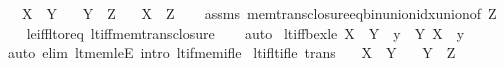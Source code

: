 \begin{isabellebody}
\ \ \ {\isachardoublequoteopen}X\ {\isasymle}\ Y{\isachardoublequoteclose}\isanewline
\ \ \ {\isachardoublequoteopen}Y\ {\isasymin}\ Z{\isachardoublequoteclose}\isanewline
\ \ \ {\isachardoublequoteopen}X\ {\isacharless}{\kern0pt}\ Z{\isachardoublequoteclose}\isanewline
%
\isadelimproof
\ \ %
\endisadelimproof
%
\isatagproof
{}\isamarkupfalse%
\ assms\ mem{\isacharunderscore}{\kern0pt}trans{\isacharunderscore}{\kern0pt}closure{\isacharunderscore}{\kern0pt}eq{\isacharunderscore}{\kern0pt}bin{\isacharunderscore}{\kern0pt}union{\isacharunderscore}{\kern0pt}idx{\isacharunderscore}{\kern0pt}union{\isacharbrackleft}{\kern0pt}of\ Z{\isacharbrackright}{\kern0pt}\isanewline
\ \ \isamarkupfalse%
\ le{\isacharunderscore}{\kern0pt}iff{\isacharunderscore}{\kern0pt}lt{\isacharunderscore}{\kern0pt}or{\isacharunderscore}{\kern0pt}eq\ lt{\isacharunderscore}{\kern0pt}iff{\isacharunderscore}{\kern0pt}mem{\isacharunderscore}{\kern0pt}trans{\isacharunderscore}{\kern0pt}closure\isanewline
\ \ \isamarkupfalse%
\ auto%
\endisatagproof
{\isafoldproof}%
%
\isadelimproof
\isanewline
%
\endisadelimproof
\isanewline
{}\isamarkupfalse%
\ lt{\isacharunderscore}{\kern0pt}iff{\isacharunderscore}{\kern0pt}bex{\isacharunderscore}{\kern0pt}le{\isacharcolon}{\kern0pt}\ {\isachardoublequoteopen}X\ {\isacharless}{\kern0pt}\ Y\ {\isasymlongleftrightarrow}\ {\isacharparenleft}{\kern0pt}{\isasymexists}y\ {\isasymin}\ Y{\isachardot}{\kern0pt}\ X\ {\isasymle}\ y{\isacharparenright}{\kern0pt}{\isachardoublequoteclose}\isanewline
%
\isadelimproof
\ \ %
\endisadelimproof
%
\isatagproof
{}\isamarkupfalse%
\ {\isacharparenleft}{\kern0pt}auto\ elim{\isacharcolon}{\kern0pt}\ lt{\isacharunderscore}{\kern0pt}mem{\isacharunderscore}{\kern0pt}leE\ intro{\isacharcolon}{\kern0pt}\ lt{\isacharunderscore}{\kern0pt}if{\isacharunderscore}{\kern0pt}mem{\isacharunderscore}{\kern0pt}if{\isacharunderscore}{\kern0pt}le{\isacharparenright}{\kern0pt}%
\endisatagproof
{\isafoldproof}%
%
\isadelimproof
\isanewline
%
\endisadelimproof
\isanewline
{}\isamarkupfalse%
\ lt{\isacharunderscore}{\kern0pt}if{\isacharunderscore}{\kern0pt}lt{\isacharunderscore}{\kern0pt}if{\isacharunderscore}{\kern0pt}le\ {\isacharbrackleft}{\kern0pt}trans{\isacharbrackright}{\kern0pt}{\isacharcolon}{\kern0pt}\isanewline
\ \ \ {\isachardoublequoteopen}X\ {\isasymle}\ Y{\isachardoublequoteclose}\isanewline
\ \ \ {\isachardoublequoteopen}Y\ {\isacharless}{\kern0pt}\ Z{\isachardoublequoteclose}\isanewline

\end{isabellebody}
